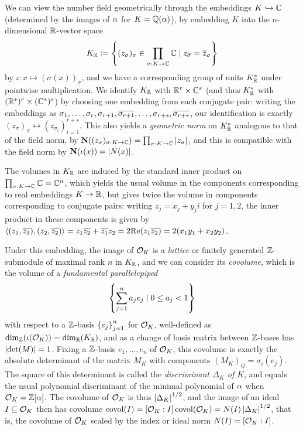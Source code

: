 \documentclass[11pt]{report}
\begin{document}
We can view the number field geometrically through the embeddings $K \hookrightarrow \mathbb{C}$ (determined by the images of $\alpha$ for $K = \mathbb{Q}(\alpha)$), by embedding $K$ into the $n$-dimensional $\mathbb{R}$-vector space 
$$
    K_{\mathbb{R}} \vcentcolon= \left\{  (z_\sigma)_{\sigma} \in \prod_{\sigma : K \to \mathbb{C}}\mathbb{C} \mid z_{\overline{\sigma}} = \overline{z}_\sigma  \right\}
$$
by $\iota : x \mapsto (\sigma(x))_{\sigma}$, and we have a corresponding group of units $K_{\mathbb{R}}^*$ under pointwise multiplication. We identify $K_{\mathbb{R}}$ with $\mathbb{R}^r \times \mathbb{C}^s$ (and thus $K_{\mathbb{R}}^*$ with $(\mathbb{R}^*)^r \times (\mathbb{C}^*)^s$) by choosing one embedding from each conjugate pair: writing the embeddings as $\sigma_1, \ldots, \sigma_r, \sigma_{r + 1}, \overline{\sigma_{r + 1}}, \ldots, \sigma_{r + s}, \overline{\sigma_{r + s}}$, our identification is exactly $(z_\sigma)_\sigma \leftrightarrow (z_{\sigma_i})_{i = 1}^{r + s}$. This also yields a \hypertarget{geomnorm}{\emph{geometric norm}} on $K_{\mathbb{R}}^*$ analogous to that of the field norm, by $\operatorname{\mathbf{N}}((z_\sigma)_{\sigma : K \to \mathbb{C}}) = \prod_{\sigma : K \to \mathbb{C}}\left| z_\sigma \right|$, and this is compatible with the field norm by $\operatorname{\mathbf{N}}(\iota(x)) = \left| N(x) \right|$.

The volumes in $K_{\mathbb{R}}$ are induced by the standard inner product on $\prod_{\sigma : K \to \mathbb{C}}\mathbb{C} = \mathbb{C}^n$, which yields the usual volume in the components corresponding to real embeddings $K \to \mathbb{R}$, but gives twice the volume in components corresponding to conjugate pairs: writing $z_j = x_j + y_ji$ for $j = 1, 2$, the inner product in these components is given by $\left\langle (z_1, \overline{z_1}), (z_2, \overline{z_2}) \right\rangle = z_1\overline{z_2} + \overline{z_1}z_2 = 2\text{Re}(z_1\overline{z_2}) = 2(x_1y_1 + x_2y_2)$.


Under this embedding, the image of $\mathcal{O}_K$ is a \emph{lattice} or finitely generated $\mathbb{Z}$-submodule of maximal rank $n$ in $K_{\mathbb{R}}$, and we can consider its \emph{covolume}, which is the volume of a \emph{fundamental parallelepiped} 
$$
    \left\{  \sum_{j = 1}^na_je_j \mid 0 \leq a_j < 1  \right\}
$$
with respect to a $\mathbb{Z}$-basis $\left\{  e_j  \right\}_{j = 1}^n$ for $\mathcal{O}_K$, well-defined as $\dim_{\mathbb{Z}}(\iota(\mathcal{O}_K)) = \dim_{\mathbb{R}}(K_{\mathbb{R}})$, and as a change of basis matrix between $\mathbb{Z}$-bases has $\left| \det(M) \right| = 1$. Fixing a $\mathbb{Z}$-basis $e_1, \ldots, e_n$ of $\mathcal{O}_K$, this covolume is exactly the absolute determinant of the matrix $M_K$ with components $(M_K)_{ij} = \sigma_i(e_j)$. The square of this determinant is called the \emph{discriminant $\Delta_K$ of $K$}, and equals the usual polynomial discriminant of the minimal polynomial of $\alpha$ when $\mathcal{O}_K = \mathbb{Z}[\alpha]$. The covolume of $\mathcal{O}_K$ is thus $\left| \Delta_K \right|^{1/2}$, and the image of an ideal $I \subseteq \mathcal{O}_K$ then has covolume $\operatorname{covol}(I) = [\mathcal{O}_K : I]\operatorname{covol}(\mathcal{O}_K) = N(I)\left| \Delta_K \right|^{1/2}$, that is, the covolume of $\mathcal{O}_K$ scaled by the index or ideal norm $N(I) = [\mathcal{O}_K : I]$.
\end{document}
